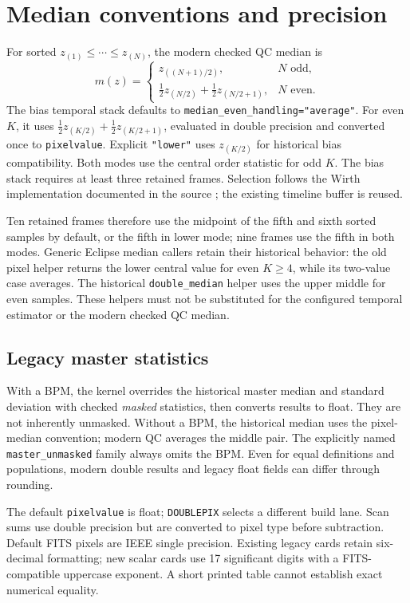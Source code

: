 \documentclass[11pt,a4paper]{article}
\newcommand{\code}[1]{\nolinkurl{#1}}
\begin{document}
\newpage
\section{Median conventions and precision}\label{sec:medians}
For sorted $z_{(1)}\leq\cdots\leq z_{(N)}$, the modern checked QC median is
\[
 m(z)=\begin{cases}z_{((N+1)/2)},&N\text{ odd},\\
 \tfrac12 z_{(N/2)}+\tfrac12 z_{(N/2+1)},&N\text{ even}.\end{cases}
\]
The bias temporal stack defaults to \code{median_even_handling="average"}.
For even $K$, it uses $\tfrac12 z_{(K/2)}+\tfrac12 z_{(K/2+1)}$, evaluated
in double precision and converted once to \code{pixelvalue}. Explicit
\code{"lower"} uses $z_{(K/2)}$ for historical bias compatibility. Both modes
use the central order statistic for odd $K$. The bias stack requires at least
three retained frames. Selection follows the Wirth implementation documented
in the source \cite{wirth}; the existing timeline buffer is reused.

Ten retained frames therefore use the midpoint of the fifth and sixth sorted
samples by default, or the fifth in lower mode; nine frames use the fifth in
both modes. Generic Eclipse median callers retain their historical behavior:
the old pixel helper returns the lower central value for even $K\geq4$, while
its two-value case averages. The historical \code{double_median} helper uses
the upper middle for even samples. These helpers must not be substituted for
the configured temporal estimator or the modern checked QC median.

\subsection*{Legacy master statistics}
With a BPM, the kernel overrides the historical master median and standard
deviation with checked \emph{masked} statistics, then converts results to
float. They are not inherently unmasked. Without a BPM, the historical median
uses the pixel-median convention; modern QC averages the middle pair.
The explicitly named \code{master_unmasked} family always omits the BPM.
Even for equal definitions and populations, modern double results and legacy
float fields can differ through rounding.

The default \code{pixelvalue} is float; \code{DOUBLEPIX} selects a different
build lane. Scan sums use double precision but are converted to pixel type
before subtraction. Default FITS pixels are IEEE single precision. Existing
legacy cards retain six-decimal formatting; new scalar cards use 17 significant
digits with a FITS-compatible uppercase exponent. A short printed table cannot
establish exact numerical equality.
\end{document}
